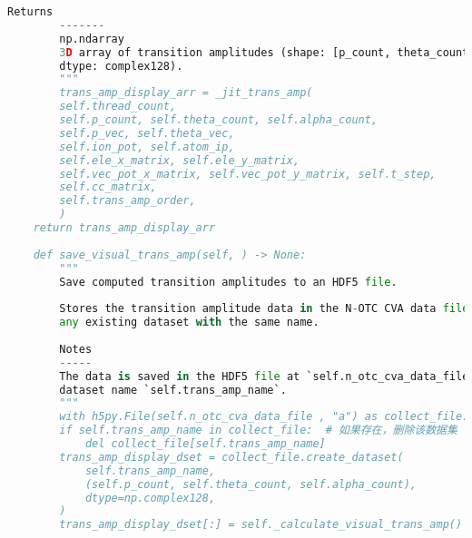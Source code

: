 \begin{lstlisting}[language=Python, caption={非正交激光跃迁振幅求解示范}, label={code:notc cva trans amp}]
		Returns
		-------
		np.ndarray
		3D array of transition amplitudes (shape: [p_count, theta_count, alpha_count],
		dtype: complex128).
		"""
		trans_amp_display_arr = _jit_trans_amp(
		self.thread_count,
		self.p_count, self.theta_count, self.alpha_count,
		self.p_vec, self.theta_vec,
		self.ion_pot, self.atom_ip,
		self.ele_x_matrix, self.ele_y_matrix,
		self.vec_pot_x_matrix, self.vec_pot_y_matrix, self.t_step,
		self.cc_matrix,
		self.trans_amp_order,
		)
	return trans_amp_display_arr
	
	def save_visual_trans_amp(self, ) -> None:
		"""
		Save computed transition amplitudes to an HDF5 file.
		
		Stores the transition amplitude data in the N-OTC CVA data file, overwriting
		any existing dataset with the same name.
		
		Notes
		-----
		The data is saved in the HDF5 file at `self.n_otc_cva_data_file` under the
		dataset name `self.trans_amp_name`.
		"""
		with h5py.File(self.n_otc_cva_data_file , "a") as collect_file:
		if self.trans_amp_name in collect_file:  # 如果存在，删除该数据集
			del collect_file[self.trans_amp_name]
		trans_amp_display_dset = collect_file.create_dataset(
			self.trans_amp_name,
			(self.p_count, self.theta_count, self.alpha_count),
			dtype=np.complex128,
		)
		trans_amp_display_dset[:] = self._calculate_visual_trans_amp()
\end{lstlisting}